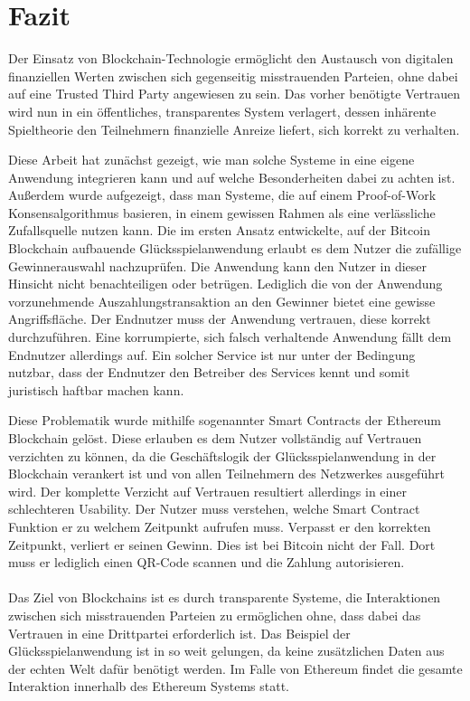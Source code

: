 \chapter{Fazit} %
Der Einsatz von Blockchain-Technologie ermöglicht
den Austausch von digitalen finanziellen Werten zwischen sich gegenseitig misstrauenden Parteien, ohne dabei auf eine Trusted Third Party angewiesen zu sein.
Das vorher benötigte Vertrauen wird nun in ein öffentliches, transparentes System verlagert, dessen inhärente Spieltheorie den Teilnehmern finanzielle Anreize liefert, sich korrekt zu verhalten. 

Diese Arbeit hat zunächst gezeigt, wie man solche Systeme in eine eigene Anwendung integrieren kann und auf welche Besonderheiten dabei zu achten ist. 
Außerdem wurde aufgezeigt, dass man Systeme, die auf einem Proof-of-Work Konsensalgorithmus basieren, in einem gewissen Rahmen als eine verlässliche Zufallsquelle nutzen kann.
Die im ersten Ansatz entwickelte, auf der Bitcoin Blockchain aufbauende Glücksspielanwendung erlaubt es dem Nutzer die zufällige Gewinnerauswahl nachzuprüfen. Die Anwendung kann den Nutzer in dieser Hinsicht nicht benachteiligen oder betrügen. Lediglich die von der Anwendung vorzunehmende Auszahlungstransaktion an den Gewinner bietet eine gewisse Angriffsfläche. Der Endnutzer muss der Anwendung vertrauen, diese korrekt durchzuführen. Eine korrumpierte, sich falsch verhaltende Anwendung fällt dem Endnutzer allerdings auf. Ein solcher Service ist nur unter der Bedingung nutzbar, dass der Endnutzer den Betreiber des Services kennt und somit juristisch haftbar machen kann. 

Diese Problematik wurde mithilfe sogenannter Smart Contracts der Ethereum Blockchain gelöst.
Diese erlauben es dem Nutzer vollständig auf Vertrauen verzichten zu können, da die Geschäftslogik der Glücksspielanwendung in der Blockchain verankert ist und von allen Teilnehmern des Netzwerkes ausgeführt wird. Der komplette Verzicht auf Vertrauen resultiert allerdings in einer schlechteren Usability. Der Nutzer muss verstehen, welche Smart Contract Funktion er zu welchem Zeitpunkt aufrufen muss. Verpasst er den korrekten Zeitpunkt, verliert er seinen Gewinn. Dies ist bei Bitcoin nicht der Fall. Dort muss er lediglich einen QR-Code scannen und die Zahlung autorisieren.\\\\


Das Ziel von Blockchains ist es durch transparente Systeme, die Interaktionen zwischen sich misstrauenden Parteien zu ermöglichen ohne, dass dabei das Vertrauen in eine Drittpartei erforderlich ist. Das Beispiel der Glücksspielanwendung ist in so weit gelungen, da keine zusätzlichen Daten aus der echten Welt dafür benötigt werden. Im Falle von Ethereum findet die gesamte Interaktion innerhalb des Ethereum Systems statt.


